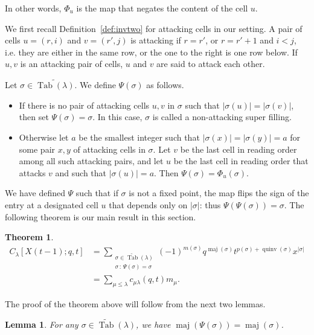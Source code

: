 \documentclass[11pt]{article}
\newtheorem{theorem}[theo]{Theorem}
\newtheorem{lemma}[theo]{Lemma}
\theoremstyle{definition}
\numberwithin{equation}{section}
\DeclareMathOperator{\PQT}{Tab}
\DeclareMathOperator{\maj}{maj}
\DeclareMathOperator{\quinv}{quinv}
\begin{document}
In other words, $\Phi_u$ is the map that negates the content of the cell $u$. 

We first recall Definition~\ref{def:invtwo} for attacking cells in our setting. A pair of cells $u=(r,i)$ and $v=(r',j)$ is attacking if $r=r'$, or $r=r'+1$ and $i<j$, i.e. they are either in the same row, or the one to the right is one row below. If $u,v$ is an attacking pair of cells, $u$ and $v$ are said to attack each other.

\vspace{0.1in}
\begin{defn}
\label{def:attackpair}
Let $\sigma \in\widetilde{\PQT(\lambda)}$. We define $\Psi(\sigma)$ as follows.
\begin{itemize}[leftmargin=10pt]
\item If there is no pair of attacking cells $u,v$ in $\sigma$ such that $|\sigma(u)|=|\sigma(v)|$, then set $\Psi(\sigma)=\sigma$. In this case, $\sigma$ is called a non-attacking super filling.
\item Otherwise let $a$ be the smallest integer such that $|\sigma(x)|=|\sigma(y)|=a$ for some pair $x,y$ of attacking cells in $\sigma$. Let $v$ be the last cell in reading order among all such attacking pairs, and let $u$ be the last cell in reading order that attacks $v$ and such that $|\sigma(u)|=a$. Then $\Psi(\sigma)=\Phi_u(\sigma)$.
\end{itemize}
\end{defn}

We have defined $\Psi$ such that if $\sigma$ is not a fixed point, the map flips the sign of the entry at a designated cell $u$ that depends only on $|\sigma|$: thus $\Psi(\Psi(\sigma))=\sigma$. The following theorem is our main result in this section.

\begin{theorem}
\label{lem:A1FP}
\begin{align*}
C_{\lambda}[X(t-1);q,t]& = \sum_{\substack{\sigma\in\widetilde{\PQT}(\lambda)\\\sigma\,:\,\Psi(\sigma)=\sigma}} (-1)^{m(\sigma)} q^{\maj(\sigma)}t^{p(\sigma)+\quinv(\sigma)}x^{|\sigma|}\\
&=\sum_{\mu \leq \lambda} c_{\mu\lambda}(q,t)m_{\mu}.
\end{align*}
\end{theorem}

The proof of the theorem above will follow from the next two lemmas.

\begin{lemma}\label{lem:A1maj}
For any $\sigma\in\widetilde{\PQT}(\lambda)$, we have $\maj(\Psi(\sigma))=\maj(\sigma)$.
\end{lemma}
\end{document}
